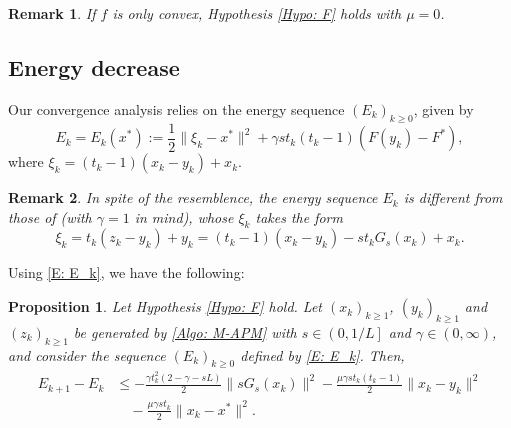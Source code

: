 \documentclass[pdflatex,sn-mathphys-num]{sn-jnl}
\theoremstyle{thmstyleone}
\newtheorem{proposition}[theorem]{Proposition}
\theoremstyle{thmstyletwo}
\newtheorem{remark}{Remark}
\theoremstyle{thmstylethree}
\begin{document}
\begin{remark}
If $f$ is only convex, Hypothesis \ref{Hypo: F} holds with $\mu=0$.
\end{remark}




\subsection{Energy decrease}
Our convergence analysis relies on the energy sequence $(E_k)_{k\ge 0}$, given by
\begin{equation}\label{E: E_k}
E_k=E_k(x^*) := \frac{1}{2}\| \xi_k - x^* \|^2 + \gamma s t_k (t_k-1) \left( F(y_k) - F^* \right),
\end{equation}
where $\xi_k = (t_k-1)(x_k-y_k) + x_k$.

\begin{remark}\label{Rem: E_k_compare}
In spite of the resemblence, the energy sequence $E_k$ is different from those of \cite{Beck_2009_Monotone,Shi_2024_Monotone} (with $\gamma=1$ in mind), whose $\xi_k$ takes the form
$$ \xi_k = t_k(z_k-y_k) + y_k = (t_k-1)(x_k-y_k) - st_kG_s(x_k) + x_k. $$
\end{remark} 

Using \eqref{E: E_k}, we have the following:

\begin{proposition}\label{Prop: E_k_diff_bound}
Let Hypothesis \ref{Hypo: F} hold. Let $(x_k)_{k\ge 1}$, $(y_k)_{k\ge 1}$ and $(z_k)_{k\ge 1}$ be generated by \eqref{Algo: M-APM} with $s\in \left( 0, 1/L \right]$ and $\gamma\in(0,\infty)$, and consider the sequence $(E_k)_{k\ge 0}$ defined by \eqref{E: E_k}. Then,
\begin{align*}
E_{k+1} - E_k
&\le - \frac{\gamma t_k^2(2-\gamma-sL)}{2}\| sG_s(x_k) \|^2
   - \frac{\mu \gamma s t_k(t_k-1)}{2} \|x_k-y_k \|^2 \\ 
&\quad - \frac{\mu\gamma s t_k}{2}\|x_k-x^* \|^2.
\end{align*}
\end{proposition}
\end{document}
